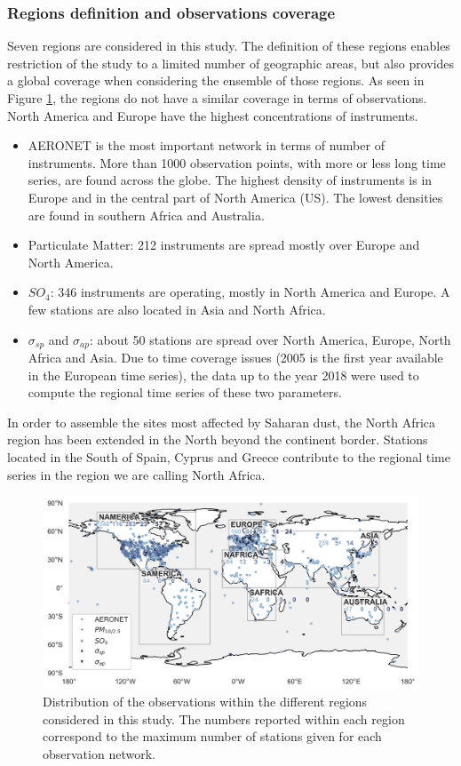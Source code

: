 \documentclass[journal abbreviation, manuscript]{copernicus}
\begin{document}
\subsubsection{Regions definition and observations coverage}
Seven regions are considered in this study. The definition of these regions enables restriction of the study to a limited number of geographic areas, but also provides a global coverage when considering the ensemble of those regions. As seen in Figure \ref{fig:map_obs}, the regions do not have a similar coverage in terms of observations. North America and Europe have the highest concentrations of instruments.
\begin{itemize}
 \item AERONET is the most important network in terms of number of instruments. More than 1000 observation points, with more or less long time series, are found across the globe. The highest density of instruments is in Europe and in the central part of North America (US). The lowest densities are found in southern Africa and Australia.
 \item Particulate Matter: 212 instruments are spread mostly over Europe and North America. 
 \item $SO_{4}$: 346 instruments are operating, mostly in North America and Europe. A few stations are also located in Asia and North Africa.
 \item $\sigma_{sp}$ and $\sigma_{ap}$: about 50 stations are spread over North America, Europe, North Africa and Asia. Due to time coverage issues (2005 is the first year available in the European time series), the data up to the year 2018 were used to compute the regional time series of these two parameters.
\end{itemize}

In order to assemble the sites most affected by Saharan dust, the North Africa region has been extended in the North beyond the continent border. Stations located in the South of Spain, Cyprus and Greece contribute to the regional time series in the region we are calling North Africa.

\begin{figure}
 \includegraphics[width=12cm]{../scripts/figs/maps/av_obs.png}
 \caption{Distribution of the observations within the different regions considered in this study. The numbers reported within each region correspond to the maximum number of stations given for each observation network.}
 \label{fig:map_obs}
\end{figure}
\end{document}

